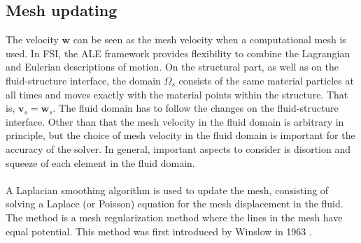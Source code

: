 \subsection{Mesh updating}
The velocity $\mathbf{w}$ can be seen as the mesh velocity when a computational mesh is used. In FSI, the ALE framework provides flexibility to combine the Lagrangian and Eulerian descriptions of motion. On the structural part, as well as on the fluid-structure interface, the domain $\Omega_s$ consists of the same material particles at all times and moves exactly with the material points within the structure. That is, $\mathbf{v}_s = \mathbf{w}_s$. The fluid domain has to follow the changes on the fluid-structure interface. Other than that the mesh velocity in the fluid domain is arbitrary in principle, but the choice of mesh velocity in the fluid domain is important for the accuracy of the solver. In general, important aspects to consider is disortion and squeeze of each element in the fluid domain. \\
\\
A Laplacian smoothing algorithm is used to update the mesh, consisting of solving a Laplace (or Poisson) equation for the mesh displacement in the fluid. The method is a mesh regularization method where the lines in the mesh have equal potential. This method was first introduced by Winslow in 1963 \cite{Wins63}.

